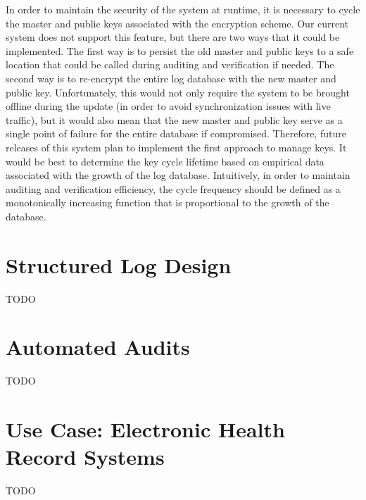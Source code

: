 \documentclass{sig-alternate}
\begin{document}
In order to maintain the security of the system at runtime, it is necessary to cycle the master and public keys
associated with the encryption scheme. Our current system does not support this feature, but there are two
ways that it could be implemented. The first way is to persist the old master and 
public keys to a safe location that could be called during auditing and verification if needed. The second way is 
to re-encrypt the entire log database with the new master and public key. Unfortunately, this would not only require the system to be 
brought offline during the update (in order to avoid synchronization issues with live traffic), but it would also
mean that the new master and public key serve as a single point of failure for the entire database if compromised. 
Therefore, future releases of this system plan to implement the first approach to manage keys. It would be
best to determine the key cycle lifetime based on empirical data associated with the growth of the log database.
Intuitively, in order to maintain auditing and verification efficiency, the cycle frequency should be defined as 
a monotonically increasing function that is proportional to the growth of the database. 

\section{Structured Log Design}
TODO

\section{Automated Audits}
TODO

\section{Use Case: Electronic Health Record Systems}
TODO

\begin{comment}
\begin{table}
\centering
\caption{Feelings about Issues}
\begin{tabular}{|l|r|l|} \hline
Flavor&Percentage&Comments\\ \hline
Issue 1 &  10\% & Loved it a lot\\ \hline
Issue 2 &  20\% & Disliked it immensely\\ \hline
Issue 3 &  30\% & Didn't care one bit\\ \hline
Issue 4 &  40\% & Duh?\\ \hline
\end{tabular}
\end{table}

\begin{figure}[htb]
\label{sample graphic}
\begin{center}
\texttt{[image: fly.jpg]}
\caption{A sample black \& white graphic (JPG).}
\end{center}
\end{figure}
\end{comment}



\balance
\end{document}
